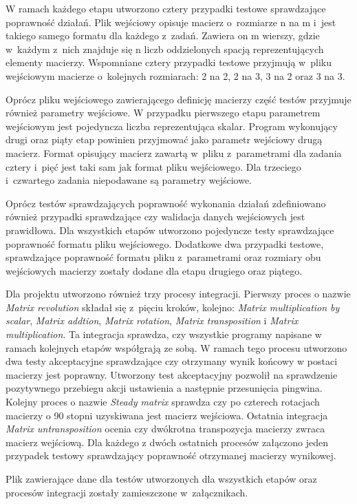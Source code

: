 W ramach każdego etapu utworzono cztery przypadki testowe sprawdzające poprawność działań.
Plik wejściowy opisuje macierz o~rozmiarze n na m i~jest takiego samego formatu dla każdego z~zadań.
Zawiera on m wierszy, gdzie w~każdym z~nich znajduje się n liczb oddzielonych spacją reprezentujących elementy macierzy.
Wspomniane cztery przypadki testowe przyjmują w~pliku wejściowym macierze o~kolejnych rozmiarach: 2 na 2, 2 na 3, 3 na 2 oraz 3 na 3.

Oprócz pliku wejściowego zawierającego definicję macierzy część testów przyjmuje również parametry wejściowe.
W przypadku pierwszego etapu parametrem wejściowym jest pojedyncza liczba reprezentująca skalar.
Program wykonujący drugi oraz piąty etap powinien przyjmować jako parametr wejściowy drugą macierz.
Format opisujący macierz zawartą w~pliku z~parametrami dla zadania cztery i~pięć jest taki sam jak format pliku wejściowego.
Dla trzeciego i~czwartego zadania niepodawane są parametry wejściowe.

Oprócz testów sprawdzających poprawność wykonania działań zdefiniowano również przypadki sprawdzające czy walidacja danych wejściowych jest prawidłowa.
Dla wszystkich etapów utworzono pojedyncze testy sprawdzające poprawność formatu pliku wejściowego.
Dodatkowe dwa przypadki testowe, sprawdzające poprawność formatu pliku z~parametrami oraz rozmiary obu wejściowych macierzy zostały dodane dla etapu drugiego oraz piątego.

Dla projektu utworzono również trzy procesy integracji.
Pierwszy proces o nazwie \textit{Matrix revolution} składał się z~pięciu kroków, kolejno: \textit{Matrix multiplication by scalar}, \textit{Matrix addtion}, \textit{Matrix rotation}, \textit{Matrix transposition} i \textit{Matrix multiplication}.
Ta integracja sprawdza, czy wszystkie programy napisane w ramach kolejnych etapów współgrają ze sobą.
W ramach tego procesu utworzono dwa testy akceptacyjne sprawdzające czy otrzymany wynik końcowy w postaci macierzy jest poprawny.
Utworzony test akceptacyjny pozwolił na sprawdzenie pozytywnego przebiegu akcji ustawienia a następnie przesunięcia pingwina.
Kolejny proces o nazwie \textit{Steady matrix} sprawdza czy po czterech rotacjach macierzy o 90 stopni uzyskiwana jest macierz wejściowa.
Ostatnia integracja \textit{Matrix untransposition} ocenia czy dwókrotna transpozycja macierzy zwraca macierz wejściową.
Dla każdego z dwóch ostatnich procesów załączono jeden przypadek testowy sprawdzający poprawność otrzymanej macierzy wynikowej.

Plik zawierające dane dla testów utworzonych dla wszystkich etapów oraz procesów integracji zostały zamieszczone w~załącznikach.

